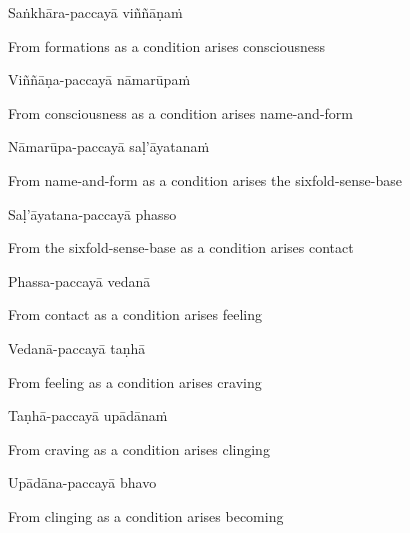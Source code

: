 Saṅkhāra-paccayā viññāṇaṁ

\begin{english}
  From formations as a condition arises consciousness
\end{english}

Viññāṇa-paccayā nāmarūpaṁ

\begin{english}
  From consciousness as a condition arises name-and-form\makeatletter\hyperlink{endnote74-appendix}\makeatother
\end{english}

Nāmarūpa-paccayā saḷ'āyatanaṁ

\begin{english}
  From name-and-form as a condition arises the sixfold-sense-base
\end{english}

Saḷ'āyatana-paccayā phasso

\begin{english}
  From the sixfold-sense-base as a condition arises contact
\end{english}

Phassa-paccayā vedanā

\begin{english}
  From contact as a condition arises feeling
\end{english}

Vedanā-paccayā taṇhā

\begin{english}
  From feeling as a condition arises craving
\end{english}

Taṇhā-paccayā upādānaṁ

\begin{english}
  From craving as a condition arises clinging
\end{english}

Upādāna-paccayā bhavo

\begin{english}
  From clinging as a condition arises becoming
\end{english}

